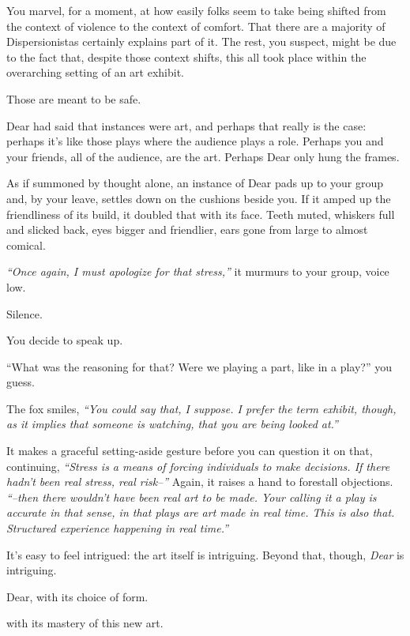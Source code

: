 You marvel, for a moment, at how easily folks seem to take being shifted from the context of violence to the context of comfort. That there are a majority of Dispersionistas certainly explains part of it. The rest, you suspect, might be due to the fact that, despite those context shifts, this all took place within the overarching setting of an art exhibit.

Those are meant to be safe.

Dear had said that instances were art, and perhaps that really is the case: perhaps it's like those plays where the audience plays a role. Perhaps you and your friends, all of the audience, are the art. Perhaps Dear only hung the frames.

As if summoned by thought alone, an instance of Dear pads up to your group and, by your leave, settles down on the cushions beside you. If it amped up the friendliness of its build, it doubled that with its face. Teeth muted, whiskers full and slicked back, eyes bigger and friendlier, ears gone from large to almost comical.

\emph{``Once again, I must apologize for that stress,''} it murmurs to your group, voice low.

Silence.

You decide to speak up.

``What was the reasoning for that? Were we playing a part, like in a play?'' you guess.

The fox smiles, \emph{``You could say that, I suppose. I prefer the term exhibit, though, as it implies that someone is watching, that you are being looked at.''}

It makes a graceful setting-aside gesture before you can question it on that, continuing, \emph{``Stress is a means of forcing individuals to make decisions. If there hadn't been real stress, real risk--''} Again, it raises a hand to forestall objections. \emph{``--then there wouldn't have been real art to be made. Your calling it a play is accurate in that sense, in that plays are art made in real time. This is also that. Structured experience happening in real time.''}

It's easy to feel intrigued: the art itself is intriguing. Beyond that, though, \emph{Dear} is intriguing.

\newpage
\null
\vfill

Dear, with its choice of form.

\phantom{Dear,} {\footnotesize with its mastery of this new art.}

